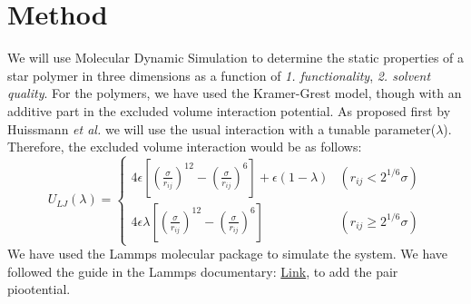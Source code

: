 \section{Method}
We will use Molecular Dynamic Simulation to determine the static properties of a star polymer in three dimensions as a function of \textit{1. functionality}, \textit{2. solvent quality}.
For the polymers, we have used the Kramer-Grest model, though with an additive part in the excluded volume interaction potential. As proposed first by Huissmann \textit{et al.} we will use the usual interaction with a tunable parameter($\lambda$). Therefore, the excluded volume interaction would be as follows:
\begin{equation}
	U_{LJ}(\lambda) =      
	\begin{cases}
		4\epsilon[(\frac{\sigma}{r_{ij}})^{12} - (\frac{\sigma}{r_{ij}})^{6}] 
  + \epsilon(1 - \lambda)
  & (r_{ij}<2^{1/6}\sigma)
  \\
		4\epsilon\lambda[(\frac{\sigma}{r_{ij}})^{12} - (\frac{\sigma}{r_{ij}})^{6}] 
  & (r_{ij}\geq2^{1/6}\sigma)
	\end{cases}
\end{equation}
We have used the Lammps molecular package to simulate the system. We have followed the guide in the Lammps documentary: 
\hyperlink{https://docs.lammps.org/Developer_write_pair.html}{Link}, to add the pair piootential. 

